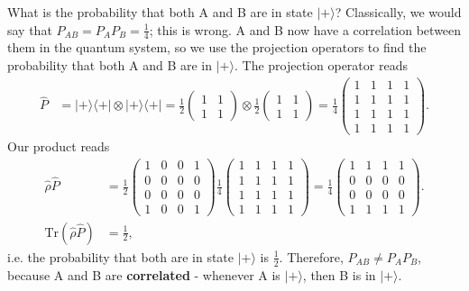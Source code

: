 \documentclass[a4paper, 11pt, normalem]{report}
\begin{document}
\begin{example}
    What is the probability that both A and B are in state $|+\rangle$?
    Classically, we would say that $P_{AB}=P_AP_B=\frac14$; this is wrong.
    A and B now have a correlation between them in the quantum system, so we use the projection operators to find the probability that both A and B are in $|+\rangle$.
    The projection operator reads
    \begin{align}
        \hat{P} &= |+\rangle\langle+| \otimes |+\rangle\langle+| = \frac12\begin{pmatrix}1 & 1 \\ 1 & 1\end{pmatrix} \otimes \frac12\begin{pmatrix}1 & 1 \\ 1 & 1\end{pmatrix} = \frac14\begin{pmatrix} 1&1&1&1\\1&1&1&1\\1&1&1&1\\1&1&1&1\end{pmatrix}.
    \end{align}
    Our product reads
    \begin{align}
        \hat{\rho}\hat{P} &= \frac12 \begin{pmatrix} 1 & 0 & 0 & 1 \\ 0 &0&0 & 0 \\ 0 & 0 & 0 & 0 \\ 1 & 0 & 0 & 1\end{pmatrix} \frac14\begin{pmatrix} 1&1&1&1\\1&1&1&1\\1&1&1&1\\1&1&1&1\end{pmatrix} = \frac14\begin{pmatrix} 1&1&1&1\\0&0&0&0\\0&0&0&0\\1&1&1&1\end{pmatrix}.\\
        \text{Tr}(\hat{\rho}\hat{P}) &= \frac12,
    \end{align}
    i.e. the probability that both are in state $|+\rangle$ is $\frac12$.
    Therefore, $P_{AB}\neq P_AP_B$, because A and B are \textbf{correlated} - whenever A is $|+\rangle$, then B is in $|+\rangle$.
\end{example}
\end{document}

